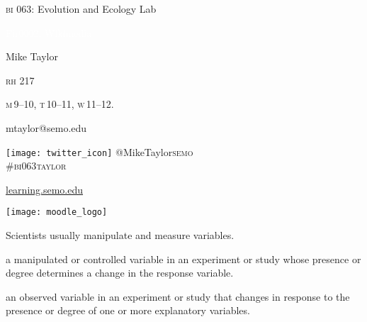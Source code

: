 \documentclass[t]{beamer}
\begin{document}
{
\begin{frame}[b,plain]{\textcolor{orange7}{\textsc{bi} 063: Evolution and Ecology Lab}}


\hfill\textcolor{white}{\tiny Fir0002, Wikimedia }
\end{frame}
}

{
\begin{frame}[t,plain]
	\large
	\vspace{5ex}
	\hangpara \hspace{17em} Mike Taylor

	\hangpara \hspace{17em} \textsc{rh} 217

	\hangpara \hspace{17em} \textsc{m}\,9--10, \textsc{t}\,10--11, \textsc{w}\,11--12.

	\hangpara \hspace{17em} mtaylor@semo.edu
	
	\hangpara \hspace{17em} \texttt{[image: twitter\_icon]} @MikeTaylor\textsc{semo}\\
	\hspace{17em} \#\textsc{bi}063\textsc{taylor}

\end{frame}
}


\begin{frame}[t]{\href{http://learning.semo.edu}{learning.semo.edu}}
	\begin{center}
		\texttt{[image: moodle\_logo]}
		
		\medskip
		
	\end{center}
	
\end{frame}


%
\begin{frame}{Scientists usually manipulate and measure variables.}
	
	\hangpara  {} a manipulated or controlled variable in an experiment
	or study whose presence or degree determines a change in the response
	variable.  
	
	\hangpara  {} an observed variable in an experiment or
	study that changes in response to the presence or degree of one
	or more explanatory variables.  
	
\end{frame}
\end{document}
